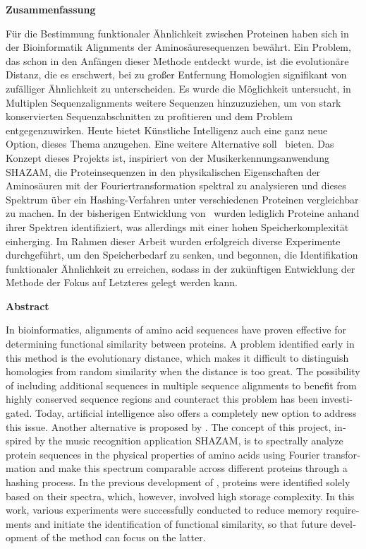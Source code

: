 \label{sec:abstract}
    \begin{center}
      \textbf{Zusammenfassung}
    \end{center}
    Für die Bestimmung funktionaler Ähnlichkeit zwischen Proteinen haben sich in der Bioinformatik Alignments der Aminosäuresequenzen bewährt. Ein Problem, das schon in den Anfängen dieser Methode entdeckt wurde, ist die evolutionäre Distanz, die es erschwert, bei zu großer Entfernung Homologien signifikant von zufälliger Ähnlichkeit zu unterscheiden. Es wurde die Möglichkeit untersucht, in Multiplen Sequenzalignments weitere Sequenzen hinzuzuziehen, um von stark konservierten Sequenzabschnitten zu profitieren und dem Problem entgegenzuwirken. Heute bietet Künstliche Intelligenz auch eine ganz neue Option, dieses Thema anzugehen. Eine weitere Alternative soll \protfin\ bieten. Das Konzept dieses Projekts ist, inspiriert von der Musikerkennungsanwendung SHAZAM, die Proteinsequenzen in den physikalischen Eigenschaften der Aminosäuren mit der Fouriertransformation spektral zu analysieren und dieses Spektrum über ein Hashing-Verfahren unter verschiedenen Proteinen vergleichbar zu machen. In der bisherigen Entwicklung von \protfin\ wurden lediglich Proteine anhand ihrer Spektren identifiziert, was allerdings mit einer hohen Speicherkomplexität einherging. Im Rahmen dieser Arbeit wurden erfolgreich diverse Experimente durchgeführt, um den Speicherbedarf zu senken, und begonnen, die Identifikation funktionaler Ähnlichkeit zu erreichen, sodass in der zukünftigen Entwicklung der Methode der Fokus auf Letzteres gelegt werden kann.
\vspace{4em}
    \begin{otherlanguage}{english}
        \begin{center}
          \textbf{Abstract}
        \end{center}
        In bioinformatics, alignments of amino acid sequences have proven effective for determining functional similarity between proteins. A problem identified early in this method is the evolutionary distance, which makes it difficult to distinguish homologies from random similarity when the distance is too great. The possibility of including additional sequences in multiple sequence alignments to benefit from highly conserved sequence regions and counteract this problem has been investigated. Today, artificial intelligence also offers a completely new option to address this issue. Another alternative is proposed by \protfin. The concept of this project, inspired by the music recognition application SHAZAM, is to spectrally analyze protein sequences in the physical properties of amino acids using Fourier transformation and make this spectrum comparable across different proteins through a hashing process. In the previous development of \protfin, proteins were identified solely based on their spectra, which, however, involved high storage complexity. In this work, various experiments were successfully conducted to reduce memory requirements and initiate the identification of functional similarity, so that future development of the method can focus on the latter.
    \end{otherlanguage}